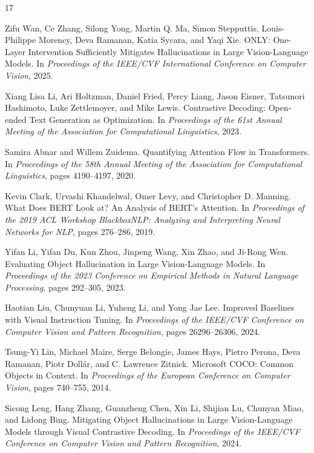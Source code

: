 {
\begin{thebibliography}{17}

Zifu Wan, Ce Zhang, Silong Yong, Martin Q. Ma, Simon Stepputtis, Louis-Philippe Morency, Deva Ramanan, Katia Sycara, and Yaqi Xie.
\newblock ONLY: One-Layer Intervention Sufficiently Mitigates Hallucinations in Large Vision-Language Models.
\newblock In \textit{Proceedings of the IEEE/CVF International Conference on Computer Vision}, 2025.

Xiang Lisa Li, Ari Holtzman, Daniel Fried, Percy Liang, Jason Eisner, Tatsunori Hashimoto, Luke Zettlemoyer, and Mike Lewis.
\newblock Contrastive Decoding: Open-ended Text Generation as Optimization.
\newblock In \textit{Proceedings of the 61st Annual Meeting of the Association for Computational Linguistics}, 2023.

Samira Abnar and Willem Zuidema.
\newblock Quantifying Attention Flow in Transformers.
\newblock In \textit{Proceedings of the 58th Annual Meeting of the Association for Computational Linguistics}, pages 4190--4197, 2020.

Kevin Clark, Urvashi Khandelwal, Omer Levy, and Christopher D. Manning.
\newblock What Does BERT Look at? An Analysis of BERT's Attention.
\newblock In \textit{Proceedings of the 2019 ACL Workshop BlackboxNLP: Analyzing and Interpreting Neural Networks for NLP}, pages 276--286, 2019.

Yifan Li, Yifan Du, Kun Zhou, Jinpeng Wang, Xin Zhao, and Ji-Rong Wen.
\newblock Evaluating Object Hallucination in Large Vision-Language Models.
\newblock In \textit{Proceedings of the 2023 Conference on Empirical Methods in Natural Language Processing}, pages 292--305, 2023.

Haotian Liu, Chunyuan Li, Yuheng Li, and Yong Jae Lee.
\newblock Improved Baselines with Visual Instruction Tuning.
\newblock In \textit{Proceedings of the IEEE/CVF Conference on Computer Vision and Pattern Recognition}, pages 26296--26306, 2024.

Tsung-Yi Lin, Michael Maire, Serge Belongie, James Hays, Pietro Perona, Deva Ramanan, Piotr Doll\'ar, and C. Lawrence Zitnick.
\newblock Microsoft COCO: Common Objects in Context.
\newblock In \textit{Proceedings of the European Conference on Computer Vision}, pages 740--755, 2014.

Sicong Leng, Hang Zhang, Guanzheng Chen, Xin Li, Shijian Lu, Chunyan Miao, and Lidong Bing.
\newblock Mitigating Object Hallucinations in Large Vision-Language Models through Visual Contrastive Decoding.
\newblock In \textit{Proceedings of the IEEE/CVF Conference on Computer Vision and Pattern Recognition}, 2024.


\end{thebibliography}}
